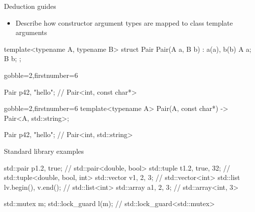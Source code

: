 \begin{frame}[fragile]
  \begin{block}{Deduction guides}
    \begin{itemize}
    \item Describe how constructor argument types are mapped to class template arguments
    \end{itemize}
  \end{block}
  \begin{cppcode}
    template<typename A, typename B>
    struct Pair {
     Pair(A a, B b) : a(a), b(b) {}
     A a; B b;
    };
  \end{cppcode}
  \begin{overprint}[\columnwidth]
    \begin{cppcode*}{gobble=2,firstnumber=6}



      Pair p{42, "hello"}; // Pair<int, const char*>
    \end{cppcode*}
    \begin{cppcode*}{gobble=2,firstnumber=6}
      template<typename A>
      Pair(A, const char*) -> Pair<A, std::string>;

      Pair p{42, "hello"}; // Pair<int, std::string>
    \end{cppcode*}
  \end{overprint}
\end{frame}

\begin{frame}[fragile]
  \begin{block}{Standard library examples}
    \begin{cppcode*}{}
      std::pair p{1.2, true}; // std::pair<double, bool>
      std::tuple t{1.2, true, 32};
                        // std::tuple<double, bool, int>
      std::vector v{1, 2, 3}; // std::vector<int>
      std::list l{v.begin(), v.end()}; // std::list<int>
      std::array a{1, 2, 3}; // std::array<int, 3>

      std::mutex m;
      std::lock_guard l(m); // std::lock_guard<std::mutex>
    \end{cppcode*}
  \end{block}
\end{frame}

